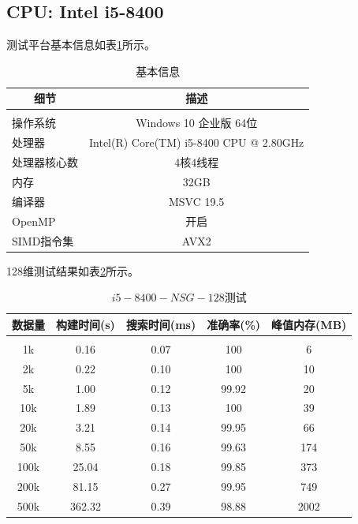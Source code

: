 \documentclass[a4paper, 11pt, UTF8]{ctexart}%
\begin{document}
\subsection{CPU: Intel i5-8400}
测试平台基本信息如表\ref{tab:basic-info-i5-8400}所示。
\begin{table}[H]
\caption{基本信息}
\label{tab:basic-info-i5-8400}
\begin{center}
\begin{tabular}{lc}
\multicolumn{1}{c}{\bf 细节}  &\multicolumn{1}{c}{\bf 描述}
\\ \hline \\
操作系统         &Windows 10 企业版 64位 \\
处理器           &Intel(R) Core(TM) i5-8400 CPU @ 2.80GHz \\
处理器核心数     &4核4线程 \\
内存             &32GB \\
编译器           &MSVC 19.5 \\
OpenMP           &开启 \\
SIMD指令集       &AVX2 \\
\end{tabular}
\end{center}
\end{table}

128维测试结果如表\ref{tab:i5-8400-NSG-128}所示。
\begin{table}[H]
\caption{$i5-8400-NSG-128$测试}
\label{tab:i5-8400-NSG-128}
\begin{center}
\begin{tabular}{ccccc}
\multicolumn{1}{c}{\bf 数据量}  &\multicolumn{1}{c}{\bf 构建时间(s)}  &\multicolumn{1}{c}{\bf 搜索时间(ms)}  &\multicolumn{1}{c}{\bf 准确率(\%)}  &\multicolumn{1}{c}{\bf 峰值内存(MB)}
\\ \hline \\
1k & 0.16 & 0.07 & 100 & 6\\
2k & 0.22 & 0.10 & 100 & 10\\
5k & 1.00 & 0.12 & 99.92 & 20\\
10k & 1.89 & 0.13 & 100 & 39\\
20k & 3.21 & 0.14 & 99.95 & 66\\
50k & 8.55 & 0.16 & 99.63 & 174\\
100k & 25.04 & 0.18 & 99.85 & 373\\
200k & 81.15 & 0.27 & 99.95 & 749\\
500k & 362.32 & 0.39 & 98.88 & 2002\\
\end{tabular}
\end{center}
\end{table}
\end{document}

